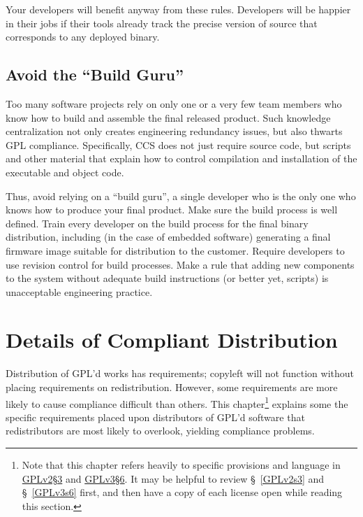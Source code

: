 Your developers will benefit anyway from these rules.  Developers will be
happier in their jobs if their tools already track the precise version of
source that corresponds to any deployed binary.

\section{Avoid the ``Build Guru''}

Too many software projects rely on only one or a very few team members who
know how to build and assemble the final released product.  Such knowledge
centralization not only creates engineering redundancy issues, but also
thwarts GPL compliance.  Specifically, CCS does not just require source code,
but scripts and other material that explain how to control compilation and
installation of the executable and object code.

Thus, avoid relying on a ``build guru'', a single developer who is the only one
who knows how to produce your final product. Make sure the build process
is well defined.  Train every developer on the build process for the final
binary distribution, including (in the case of embedded software)
generating a final firmware image suitable for distribution to the
customer.  Require developers to use revision control for build processes.
Make a rule that adding new components to the system without adequate
build instructions (or better yet, scripts) is unacceptable engineering
practice.

\chapter{Details of Compliant Distribution}

Distribution of GPL'd works has requirements; copyleft will not function
without placing requirements on redistribution.  However, some requirements
are more likely to cause compliance difficult than others.  This
chapter\footnote{Note that this chapter refers heavily to specific provisions
  and language in
  \hyperref[GPLv2s3-full-text]{GPLv2\S3}
  and \hyperref[GPLv3s6-full-text]{GPLv3\S6}.
  It may be helpful  to review \S~\ref{GPLv2s3} and \S~\ref{GPLv3s6} first,
  and then have a copy of each license open while reading this
  section.}  explains some the specific requirements placed upon
distributors of GPL'd software that redistributors are most likely to
overlook, yielding compliance problems.

